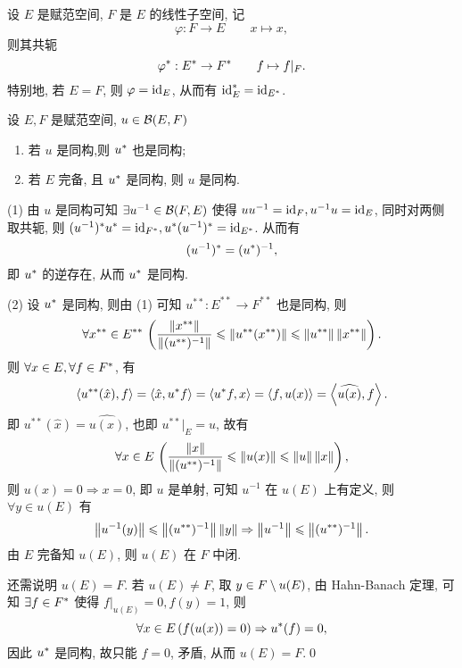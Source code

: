 	\begin{Example}
		设 $ E $ 是赋范空间, $ F $ 是 $ E $ 的线性子空间, 记
		\[
			\varphi: F\to E\qquad x\mapsto x,
		\]
		则其共轭
		\[
			\varphi^{*}: E^{*}\to F^{*}\qquad f\mapsto f|_{F}.
		\]
		特别地, 若 $ E=F $, 则 $ \varphi=\mathrm{id}_{E} $, 从而有 $ \mathrm{id}_{E}^{*}=\mathrm{id}_{E^{*}} $.
	\end{Example}	
	\begin{Theorem}
		设 $ E, F $ 是赋范空间, $ u\in\mathcal{B}(E, F) $
		\begin{enumerate}[(1)]
			\item 若 $ u $ 是同构,则 $ u^{*} $ 也是同构;
			\item 若 $ E $ 完备, 且 $ u^{*} $ 是同构, 则 $ u $ 是同构.
		\end{enumerate}
	\end{Theorem}
	\begin{Proof}
		(1) 由 $ u $ 是同构可知 $ \exists u^{-1}\in\mathcal{B}(F, E) $ 使得 $ uu^{-1}=\mathrm{id}_{F}, u^{-1}u=\mathrm{id}_{E} $, 同时对两侧取共轭, 则 $ (u^{-1})^{*}u^{*}=\mathrm{id}_{F^{*}},u^{*}(u^{-1})^{*}=\mathrm{id}_{E^{*}}  $. 从而有
		\[
			(u^{-1})^{*}=(u^{*})^{-1},
		\]
		即 $ u^{*} $ 的逆存在, 从而 $ u^{*} $ 是同构.

		(2) 设 $ u^{*} $ 是同构, 则由 (1) 可知 $ u^{**}: E^{**}\to F^{**} $ 也是同构, 则
		\[
			\forall x^{**}\in E^{**}\,\left(\frac{\left\| x^{**} \right\|}{\left\| (u^{**})^{-1} \right\|}\leqslant\left\| u^{**}(x^{**}) \right\|\leqslant\left\| u^{**} \right\|\left\| x^{**} \right\|\right).
		\]
		则 $ \forall x\in E, \forall f\in F^{*} $, 有
		\[
			\left\langle u^{**}(\hat{x}), f \right\rangle=\left\langle \hat{x}, u^{*}f \right\rangle=\left\langle u^{*}f, x \right\rangle=\left\langle f, u(x) \right\rangle=\left\langle \widehat{u(x)}, f \right\rangle.
		\]
		即 $ u^{**}(\hat{x})=\widehat{u(x)} $, 也即 $ u^{**}|_{E}=u $, 故有
		\[
			\forall x\in E\,\left( \frac{\left\| x \right\|}{\left\| (u^{**})^{-1} \right\|}\leqslant\left\| u(x) \right\|\leqslant\left\| u \right\|\left\| x \right\| \right),
		\]
		则 $ u(x)=0\Longrightarrow x=0 $, 即 $ u $ 是单射, 可知 $ u^{-1} $ 在 $ u(E) $ 上有定义, 则 $ \forall y\in u(E) $ 有
		\[
			\left\| u^{-1}(y) \right\|\leqslant\left\| (u^{**})^{-1} \right\|\left\| y \right\|\Rightarrow \left\| u^{-1} \right\|\leqslant\left\| (u^{**})^{-1} \right\|.
		\]
		由 $ E $ 完备知 $ u(E) $, 则 $ u(E) $ 在 $ F $ 中闭.

		还需说明 $ u(E)=F $. 若 $ u(E)\ne F $, 取 $ y\in F\setminus u(E) $, 由 Hahn-Banach 定理, 可知 $ \exists f\in F^{*} $ 使得 $ f|_{u(E)}=0, f(y)=1 $, 则
		\[
			\forall x\in E\,(f(u(x))=0)\Rightarrow u^{*}(f)=0,
		\]
		因此 $ u^{*} $ 是同构, 故只能 $ f=0 $, 矛盾, 从而 $ u(E)=F $.\qed
	\end{Proof}

